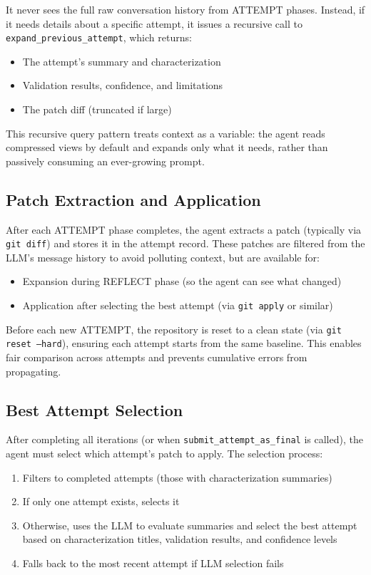 \documentclass{article}
\theoremstyle{plain}
\theoremstyle{definition}
\theoremstyle{remark}
\begin{document}
It never sees the full raw conversation history from ATTEMPT phases. Instead, if it needs details about a specific attempt, it issues a recursive call to \texttt{expand\_previous\_attempt}, which returns:
\begin{itemize}
    \item The attempt's summary and characterization
    \item Validation results, confidence, and limitations
    \item The patch diff (truncated if large)
\end{itemize}

This recursive query pattern treats context as a variable: the agent reads compressed views by default and expands only what it needs, rather than passively consuming an ever-growing prompt.

\subsection{Patch Extraction and Application}
After each ATTEMPT phase completes, the agent extracts a patch (typically via \texttt{git diff}) and stores it in the attempt record. These patches are filtered from the LLM's message history to avoid polluting context, but are available for:
\begin{itemize}
    \item Expansion during REFLECT phase (so the agent can see what changed)
    \item Application after selecting the best attempt (via \texttt{git apply} or similar)
\end{itemize}

Before each new ATTEMPT, the repository is reset to a clean state (via \texttt{git reset --hard}), ensuring each attempt starts from the same baseline. This enables fair comparison across attempts and prevents cumulative errors from propagating.

\subsection{Best Attempt Selection}
After completing all iterations (or when \texttt{submit\_attempt\_as\_final} is called), the agent must select which attempt's patch to apply. The selection process:
\begin{enumerate}
    \item Filters to completed attempts (those with characterization summaries)
    \item If only one attempt exists, selects it
    \item Otherwise, uses the LLM to evaluate summaries and select the best attempt based on characterization titles, validation results, and confidence levels
    \item Falls back to the most recent attempt if LLM selection fails
\end{enumerate}
\end{document}
